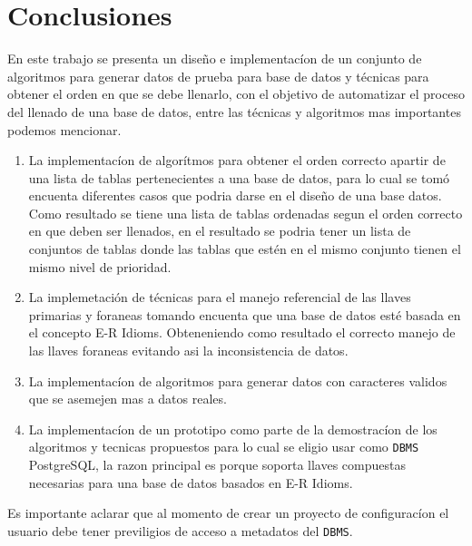 \chapter{Conclusiones}
En este trabajo se presenta un dise\~no e implementac\'ion de un conjunto de algoritmos para generar datos de prueba para base de datos y t\'ecnicas para obtener el orden en que se debe llenarlo, con el objetivo de automatizar el proceso del llenado de una base de datos, entre las t\'ecnicas y algoritmos mas importantes podemos mencionar.

\begin{enumerate}
\item La implementac\'ion de algor\'itmos para obtener el orden correcto apartir de una lista de tablas pertenecientes a una base de datos, para lo cual se tom\'o encuenta diferentes casos que podria darse en el dise\~no de una base datos. Como resultado se tiene una lista de tablas ordenadas segun el orden correcto en que deben ser llenados, en el resultado se podria tener un lista de conjuntos de tablas donde las tablas que est\'en en el mismo conjunto tienen el mismo nivel de prioridad.
\item La implemetaci\'on de t\'ecnicas para el manejo referencial de las llaves primarias y foraneas tomando encuenta que una base de datos est\'e  basada en el concepto E-R Idioms. Obteneniendo como resultado el correcto manejo de las llaves foraneas evitando asi la inconsistencia de datos.
\item La implementac\'ion de algoritmos para generar datos con caracteres validos que se asemejen mas a datos reales.
\item La implementac\'ion de un prototipo como parte de la demostrac\'ion de los algoritmos y tecnicas propuestos para lo cual se eligio usar como \texttt{DBMS} PostgreSQL, la razon principal es porque soporta llaves compuestas necesarias para una base de datos basados en E-R Idioms.   
\end{enumerate}

Es importante aclarar que al momento de crear un proyecto de configurac\'ion el usuario debe tener previligios de acceso a metadatos del \texttt{DBMS}.
